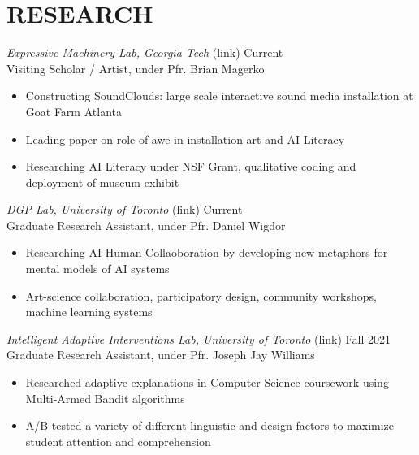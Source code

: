 \section{RESEARCH}

{\sl Expressive Machinery Lab, Georgia Tech} (\href{https://expressivemachinery.gatech.edu/}{link})\hfill
Current \\
Visiting Scholar / Artist, under Pfr. Brian Magerko  \\
\begin{itemize}
\item Constructing SoundClouds: large scale interactive sound media installation at Goat Farm Atlanta
\item Leading paper on role of awe in installation art and AI Literacy
\item Researching AI Literacy under NSF Grant, qualitative coding and deployment of museum exhibit 
\end{itemize}

{\sl DGP Lab, University of Toronto} (\href{https://www.dgp.toronto.edu/~dwigdor/}{link})\hfill
Current \\
Graduate Research Assistant, under Pfr. Daniel Wigdor \\
\begin{itemize}
\item Researching AI-Human Collaoboration by developing new metaphors for mental models of AI systems
\item  Art-science collaboration, participatory design, community workshops, machine learning systems
\end{itemize}

{\sl Intelligent Adaptive Interventions Lab, University of Toronto} (\href{http://www.josephjaywilliams.com/}{link})\hfill
Fall 2021 \\
Graduate Research Assistant, under Pfr. Joseph Jay Williams \\
\begin{itemize}
\item Researched adaptive explanations in Computer Science coursework using Multi-Armed Bandit algorithms
\item A/B tested a variety of different linguistic and design factors to maximize student attention and comprehension
\end{itemize}

